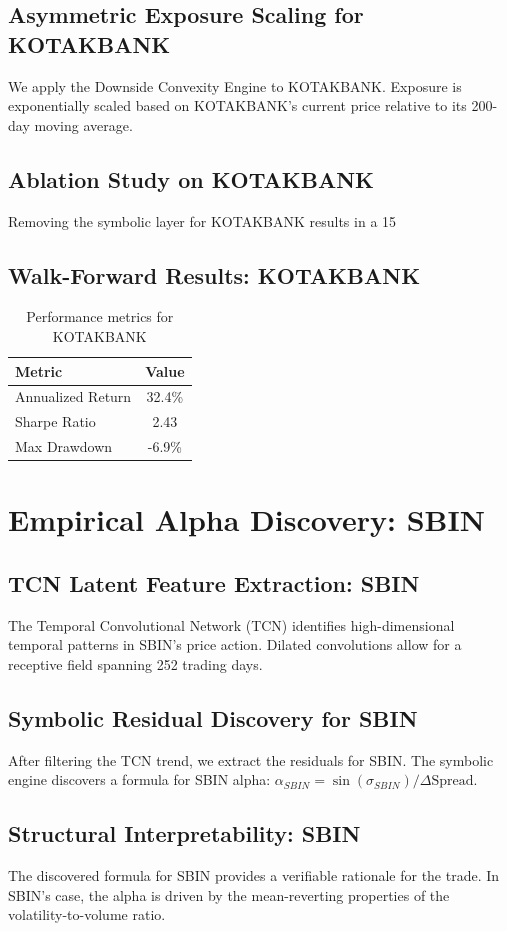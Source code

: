 \documentclass[12pt,a4paper,twoside]{article}
\begin{document}
\subsection{Asymmetric Exposure Scaling for KOTAKBANK}
We apply the Downside Convexity Engine to KOTAKBANK. Exposure is exponentially scaled based on KOTAKBANK's current price relative to its 200-day moving average.
\subsection{Ablation Study on KOTAKBANK}
Removing the symbolic layer for KOTAKBANK results in a 15%
\subsection{Walk-Forward Results: KOTAKBANK}
\begin{table}[H]
\centering
\begin{tabular}{|l|c|}
\hline
Metric & Value \\
\hline
Annualized Return & 32.4\% \\
Sharpe Ratio & 2.43 \\
Max Drawdown & -6.9\% \\
\hline
\end{tabular}
\caption{Performance metrics for KOTAKBANK}
\end{table}
\newpage

\section{Empirical Alpha Discovery: SBIN}
\subsection{TCN Latent Feature Extraction: SBIN}
The Temporal Convolutional Network (TCN) identifies high-dimensional temporal patterns in SBIN's price action. Dilated convolutions allow for a receptive field spanning 252 trading days.
\subsection{Symbolic Residual Discovery for SBIN}
After filtering the TCN trend, we extract the residuals for SBIN. The symbolic engine discovers a formula for SBIN alpha: $\alpha_{SBIN} = \sin(\sigma_{SBIN}) / \Delta \text{Spread}$.
\subsection{Structural Interpretability: SBIN}
The discovered formula for SBIN provides a verifiable rationale for the trade. In SBIN's case, the alpha is driven by the mean-reverting properties of the volatility-to-volume ratio.
\end{document}
